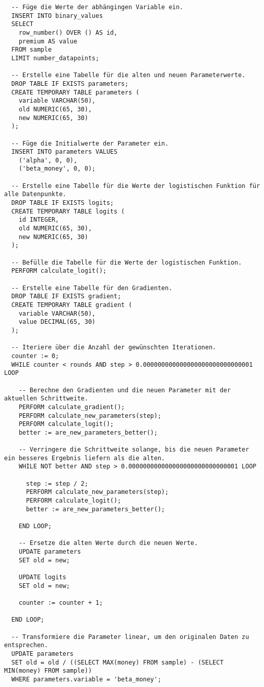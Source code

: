 \begin{verbatim}
  -- Füge die Werte der abhängingen Variable ein.
  INSERT INTO binary_values
  SELECT
    row_number() OVER () AS id,
    premium AS value
  FROM sample
  LIMIT number_datapoints;

  -- Erstelle eine Tabelle für die alten und neuen Parameterwerte.
  DROP TABLE IF EXISTS parameters;
  CREATE TEMPORARY TABLE parameters (
    variable VARCHAR(50),
    old NUMERIC(65, 30),
    new NUMERIC(65, 30)
  );

  -- Füge die Initialwerte der Parameter ein.
  INSERT INTO parameters VALUES
    ('alpha', 0, 0),
    ('beta_money', 0, 0);

  -- Erstelle eine Tabelle für die Werte der logistischen Funktion für alle Datenpunkte.
  DROP TABLE IF EXISTS logits;
  CREATE TEMPORARY TABLE logits (
    id INTEGER,
    old NUMERIC(65, 30),
    new NUMERIC(65, 30)
  );

  -- Befülle die Tabelle für die Werte der logistischen Funktion.
  PERFORM calculate_logit();

  -- Erstelle eine Tabelle für den Gradienten.
  DROP TABLE IF EXISTS gradient;
  CREATE TEMPORARY TABLE gradient (
    variable VARCHAR(50),
    value DECIMAL(65, 30)
  );

  -- Iteriere über die Anzahl der gewünschten Iterationen.
  counter := 0;
  WHILE counter < rounds AND step > 0.000000000000000000000000000001 LOOP

    -- Berechne den Gradienten und die neuen Parameter mit der aktuellen Schrittweite.
    PERFORM calculate_gradient();
    PERFORM calculate_new_parameters(step);
    PERFORM calculate_logit();
    better := are_new_parameters_better();

    -- Verringere die Schrittweite solange, bis die neuen Parameter ein besseres Ergebnis liefern als die alten.
    WHILE NOT better AND step > 0.000000000000000000000000000001 LOOP

      step := step / 2;
      PERFORM calculate_new_parameters(step);
      PERFORM calculate_logit();
      better := are_new_parameters_better();

    END LOOP;

    -- Ersetze die alten Werte durch die neuen Werte.
    UPDATE parameters
    SET old = new;

    UPDATE logits
    SET old = new;

    counter := counter + 1;

  END LOOP;

  -- Transformiere die Parameter linear, um den originalen Daten zu entsprechen.
  UPDATE parameters
  SET old = old / ((SELECT MAX(money) FROM sample) - (SELECT MIN(money) FROM sample))
  WHERE parameters.variable = 'beta_money';


\end{verbatim}
